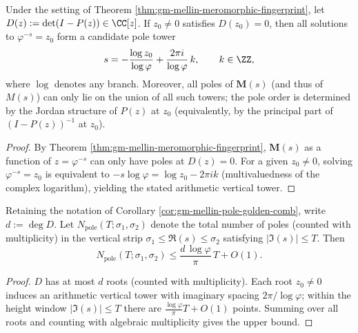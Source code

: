 \begin{corollary}\label{cor:gm-mellin-pole-golden-comb}
Under the setting of Theorem \ref{thm:gm-mellin-meromorphic-fingerprint}, let
\(
D(z):=\det(I-P(z))\in\CC[z]
\).
If \(z_0\neq 0\) satisfies \(D(z_0)=0\), then all solutions to \(\varphi^{-s}=z_0\) form a candidate pole tower
\[
s=-\frac{\log z_0}{\log\varphi}+\frac{2\pi i}{\log\varphi}\,k,\qquad k\in\ZZ,
\]
where \(\log\) denotes any branch.
Moreover, all poles of \(\mathbf{M}(s)\) (and thus of \(M(s)\)) can only lie on the union of all such towers; the pole order is determined by the Jordan structure of \(P(z)\) at \(z_0\) (equivalently, by the principal part of \((I-P(z))^{-1}\) at \(z_0\)).
\end{corollary}

\begin{proof}
By Theorem \ref{thm:gm-mellin-meromorphic-fingerprint}, \(\mathbf{M}(s)\) as a function of \(z=\varphi^{-s}\) can only have poles at \(D(z)=0\).
For a given \(z_0\neq 0\), solving \(\varphi^{-s}=z_0\) is equivalent to
\(
-s\log\varphi=\log z_0-2\pi i k
\)
(multivaluedness of the complex logarithm), yielding the stated arithmetic vertical tower.
\end{proof}

\begin{corollary}\label{cor:gm-mellin-pole-count-linear}
Retaining the notation of Corollary \ref{cor:gm-mellin-pole-golden-comb}, write \(d:=\deg D\).
Let \(N_{\mathrm{pole}}(T;\sigma_1,\sigma_2)\) denote the total number of poles (counted with multiplicity) in the vertical strip \(\sigma_1\le \Re(s)\le \sigma_2\) satisfying \(|\Im(s)|\le T\).
Then
\[
N_{\mathrm{pole}}(T;\sigma_1,\sigma_2)\le \frac{d\,\log\varphi}{\pi}\,T+O(1).
\]
\end{corollary}

\begin{proof}
\(D\) has at most \(d\) roots (counted with multiplicity).
Each root \(z_0\neq 0\) induces an arithmetic vertical tower with imaginary spacing \(2\pi/\log\varphi\); within the height window \(|\Im(s)|\le T\) there are \(\frac{\log\varphi}{\pi}T+O(1)\) points.
Summing over all roots and counting with algebraic multiplicity gives the upper bound.
\end{proof}

